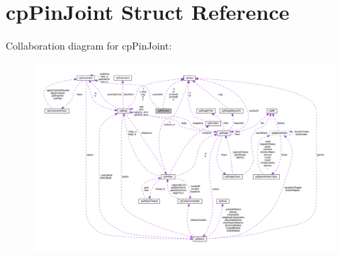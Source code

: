 \hypertarget{structcpPinJoint}{}\section{cp\+Pin\+Joint Struct Reference}
\label{structcpPinJoint}


Collaboration diagram for cp\+Pin\+Joint\+:
\nopagebreak
\begin{figure}[H]
\begin{center}
\leavevmode
\includegraphics[width=350pt]{structcpPinJoint__coll__graph}
\end{center}
\end{figure}

